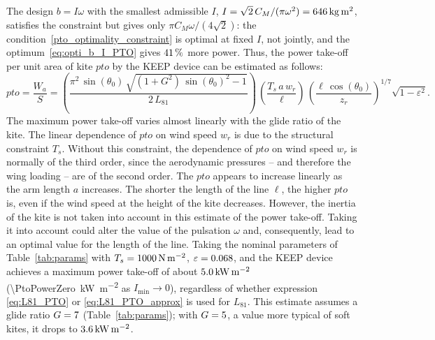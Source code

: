 The design \(b = I\omega\) with the smallest admissible \(I\), \(I = \sqrt2\,C_M/(\pi\omega^2) = \SI{646}{\kilogram\meter\squared}\), satisfies the constraint but gives only \(\pi C_M\omega/(4\sqrt2)\): the condition~\eqref{pto_optimality_constraint} is optimal at fixed \(I\), not jointly, and the optimum~\eqref{eq:opti_b_I_PTO} gives \(41\,\%\) more power.
Thus, the power take-off per unit area of kite \(pto\) by the KEEP device can be estimated as follows:
\begin{equation} \label{eq:pto_PTO}
    pto=\frac{W_a}{S}=\left(\frac{\pi^2\,\sin(\theta_0)\,\sqrt{\left(1+G^2\right)\,{\sin(\theta_0)}^2-1}}{2\,L_{81}}\right)\,\left(\frac{T_s\,a\,w_r}{\ell}\right)\,\left(\frac{\ell\,\cos(\theta_0)}{z_r}\right)^{1/7}\sqrt{1-\varepsilon^2}.
\end{equation}
The maximum power take-off varies almost linearly with the glide ratio of the kite. The linear dependence of \(pto\) on wind speed \(w_r\) is due to the structural constraint \(T_s\). Without this constraint, the dependence of \(pto\) on wind speed \(w_r\) is normally of the third order, since the aerodynamic pressures – and therefore the wing loading  – are of the second order. The \(pto\) appears to increase linearly as the arm length \(a\) increases. The shorter the length of the line \(\ell\), the higher \(pto\) is, even if the wind speed at the height of the kite decreases. However, the inertia of the kite is not taken into account in this estimate of the power take-off. Taking it into account could alter the value of the pulsation \(\omega\) and, consequently, lead to an optimal value for the length of the line. Taking the nominal parameters of Table~\ref{tab:params} with \(T_s = \SI{1000}{\newton\per\square\meter}\), \(\varepsilon = 0.068\), and the KEEP device achieves a maximum power take-off of about \(\SI{5.0}{\kilo\watt\per\square\meter}\) (\SI{\PtoPowerZero}{\kilo\watt\per\square\meter} as \(I_{\min}\to0\)), regardless of whether expression \eqref{eq:L81_PTO} or \eqref{eq:L81_PTO_approx} is used for $L_{81}$. This estimate assumes a glide ratio \(G = 7\) (Table~\ref{tab:params}); with \(G = 5\), a value more typical of soft kites, it drops to \(\SI{3.6}{\kilo\watt\per\square\meter}\).



